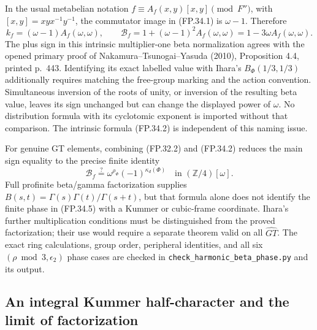 In the usual metabelian notation
$f\equiv A_f(x,y)[x,y]\pmod{F''}$, with
$[x,y]=xyx^{-1}y^{-1}$, the commutator image in (FP.34.1) is
$\omega-1$. Therefore
\[
 k_f=(\omega-1)A_f(\omega,\omega),\qquad
 \mathcal B_f=1+(\omega-1)^2A_f(\omega,\omega)
            =1-3\omega A_f(\omega,\omega).
 \tag{FP.34.4}
\]
The plus sign in this intrinsic multiplier-one beta normalization
agrees with the opened primary proof of
Nakamura--Tsunogai--Yasuda (2010), Proposition 4.4, printed p.~443.
Identifying its exact labelled value with Ihara's
$B_\Phi(1/3,1/3)$ additionally requires matching the free-group
marking and the action convention. Simultaneous inversion of the
roots of unity, or inversion of the resulting beta value, leaves
its sign unchanged but can change the displayed power of $\omega$.
No distribution formula with its cyclotomic exponent is imported
without that comparison. The intrinsic formula (FP.34.2) is
independent of this naming issue.

For genuine GT elements, combining (FP.32.2) and (FP.34.2) reduces
the main sign equality to the precise finite identity
\[
 \mathcal B_f\stackrel{?}{=}
            \omega^{\rho_\Phi}(-1)^{\kappa_d(\Phi)}
 \quad\text{in }(\mathbb Z/4)[\omega].
 \tag{FP.34.5}
\]
Full profinite beta/gamma factorization supplies
$B(s,t)=\Gamma(s)\Gamma(t)/\Gamma(s+t)$, but that formula alone
does not identify the finite phase in (FP.34.5) with a Kummer or
cubic-frame coordinate. Ihara's further multiplication conditions
must be distinguished from the proved factorization; their use
would require a separate theorem valid on all $\widehat{GT}$.
The exact ring calculations, group order, peripheral identities,
and all six $(\rho\bmod3,\epsilon_2)$ phase cases are checked in
\texttt{check\_harmonic\_beta\_phase.py} and its output.

\subsection{An integral Kummer half-character and the limit of factorization}


